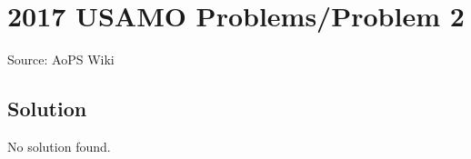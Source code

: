 \documentclass[12pt]{article}
\begin{document}
\section*{{2017 USAMO Problems/Problem 2}}
Source: AoPS Wiki

\subsection*{Solution}
No solution found.
\end{document}
